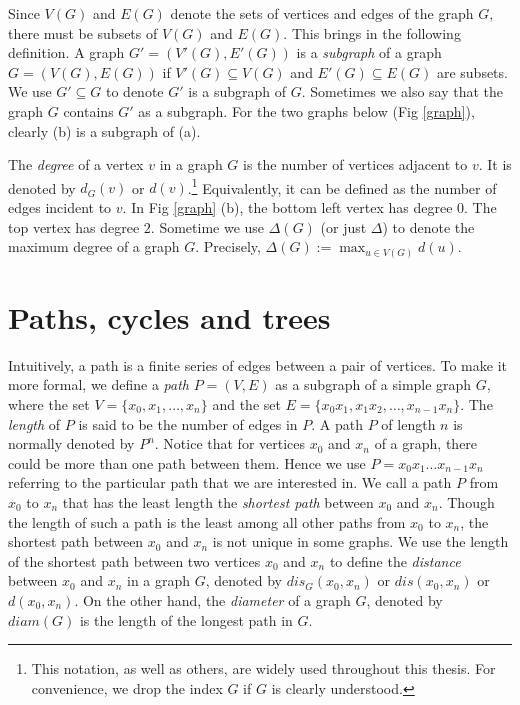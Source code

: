 Since $V(G)$ and $E(G)$ denote the sets of vertices and edges of the graph $G$, there must be subsets of $V(G)$ and $E(G)$. This brings in the following definition. A graph $G' = (V'(G), E'(G))$ is a {\it{subgraph}} of a graph $G = (V(G), E(G))$ if $V'(G) \subseteq V(G)$ and $E'(G) \subseteq E(G)$ are subsets. We use $G' \subseteq G$ to denote $G'$ is a subgraph of $G$. Sometimes we also say that the graph $G$ contains $G'$ as a subgraph.  For the two graphs below (Fig \ref{graph}), clearly (b) is a subgraph of (a). 

The {\it{degree}} of a vertex $v$ in a graph $G$ is the number of vertices adjacent to $v$. It is denoted by $d_G(v)$ or $d(v)$.\footnote{This notation, as well as others, are widely used throughout this thesis. For convenience, we drop the index $G$ if $G$ is clearly understood.}  Equivalently, it can be defined as the number of edges incident to $v$. In Fig \ref{graph} (b), the bottom left vertex has degree $0$. The top  vertex has degree $2$. Sometime we use $\Delta(G)$ (or just $\Delta$) to denote the maximum degree of a graph $G$. Precisely, $\Delta(G) := \max_{u \in V(G)} d(u)$. 


\section{Paths, cycles and trees}
Intuitively, a path is a finite series of edges between a pair of vertices. To make it more formal, we define a {\it {path}} $P = (V, E)$ as a subgraph of a simple graph $G$, where the set $V = \{x_0, x_1, \dots, x_n\}$ and the set $E = \{x_0x_1, x_1x_2, \dots, x_{n-1}x_n\}$. The {\it{length}} of $P$ is said to be the number of edges in $P$. A path $P$ of length $n$ is normally denoted by $P^n$. Notice that for vertices $x_0$ and $x_n$ of a graph, there could be more than one path between them. Hence we use $P = x_0x_1\dots x_{n-1}x_n$ referring to the particular path that we are interested in. We call a path $P$ from $x_0$ to $x_n$ that has the least length the {\it{shortest path}} between $x_0$ and $x_n$. Though the length of such a path is the least among all other paths from $x_0$ to $x_n$, the shortest path between $x_0$ and $x_n$ is not unique in some graphs. We use the length of the shortest path between two vertices $x_0$ and $x_n$ to define the {\it{distance}} between $x_0$ and $x_n$ in a graph $G$, denoted by $dis_G(x_0,x_n)$ or $dis(x_0,x_n)$ or $d(x_0,x_n)$. On the other hand, the \textit{diameter} of a graph $G$, denoted by $diam(G)$ is the length of the longest path in $G$. 

